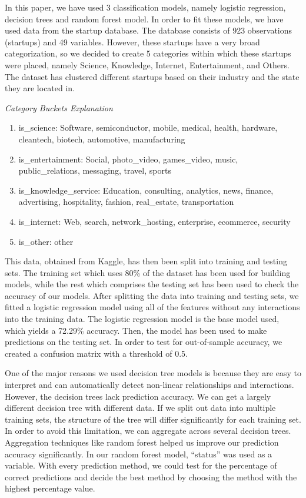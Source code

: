 \documentclass[
]{article}
\begin{document}
In this paper, we have used 3 classification models, namely logistic
regression, decision trees and random forest model. In order to fit
these models, we have used data from the startup database. The database
consists of 923 observations (startups) and 49 variables. However, these
startups have a very broad categorization, so we decided to create 5
categories within which these startups were placed, namely Science,
Knowledge, Internet, Entertainment, and Others. The dataset has
clustered different startups based on their industry and the state they
are located in.

\emph{Category Buckets Explanation}

\begin{enumerate}
\def\labelenumi{\arabic{enumi}.}
\item
  is\_science: Software, semiconductor, mobile, medical, health,
  hardware, cleantech, biotech, automotive, manufacturing
\item
  is\_entertainment: Social, photo\_video, games\_video, music,
  public\_relations, messaging, travel, sports
\item
  is\_knowledge\_service: Education, consulting, analytics, news,
  finance, advertising, hospitality, fashion, real\_estate,
  transportation
\item
  is\_internet: Web, search, network\_hosting, enterprise, ecommerce,
  security
\item
  is\_other: other
\end{enumerate}

This data, obtained from Kaggle, has then been split into training and
testing sets. The training set which uses 80\% of the dataset has been
used for building models, while the rest which comprises the testing set
has been used to check the accuracy of our models. After splitting the
data into training and testing sets, we fitted a logistic regression
model using all of the features without any interactions into the
training data. The logistic regression model is the base model used,
which yields a 72.29\% accuracy. Then, the model has been used to make
predictions on the testing set. In order to test for out-of-sample
accuracy, we created a confusion matrix with a threshold of 0.5.

One of the major reasons we used decision tree models is because they
are easy to interpret and can automatically detect non-linear
relationships and interactions. However, the decision trees lack
prediction accuracy. We can get a largely different decision tree with
different data. If we split out data into multiple training sets, the
structure of the tree will differ significantly for each training set.
In order to avoid this limitation, we can aggregate across several
decision trees. Aggregation techniques like random forest helped us
improve our prediction accuracy significantly. In our random forest
model, ``status'' was used as a variable. With every prediction method,
we could test for the percentage of correct predictions and decide the
best method by choosing the method with the highest percentage value.
\end{document}
